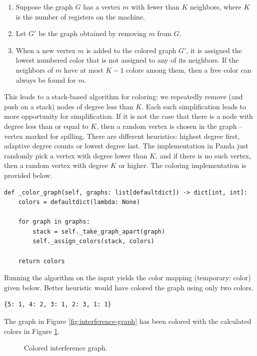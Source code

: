 \begin{enumerate}
    \item Suppose the graph $G$ has a vertex $m$ with fewer than $K$ neighbors, where $K$ is the number of registers on the machine.
    \item Let $G'$ be the graph obtained by removing $m$ from $G$.
    \item When a new vertex $m$ is added to the colored graph $G'$, it is assigned the lowest numbered color that is not assigned to any of its neighbors. If the neighbors of $m$ have at most $K-1$ colors among them, then a free color can always be found for $m$.
\end{enumerate}

This leads to a stack-based algorithm for coloring: we repeatedly remove (and push on a stack) nodes of degree less than $K$. Each such simplification leads to more opportunity for simplification. If it is not the case that there is a node with degree less than or equal to $K$, then a random vertex is chosen in the graph -- vertex marked for spilling. There are different heuristics: highest degree first, adaptive degree counts or lowest degree last. The implementation in Panda just randomly pick a vertex with degree lower than $K$, and if there is no such vertex, then a random vertex with degree $K$ or higher. The coloring implementation is provided below.

\begin{verbatim}
def _color_graph(self, graphs: list[defaultdict]) -> dict[int, int]:
    colors = defaultdict(lambda: None)

    for graph in graphs:
        stack = self._take_graph_apart(graph)
        self._assign_colors(stack, colors)

    return colors
\end{verbatim}

Running the algorithm on the input yields the color mapping (temporary: color) given below. Better heuristic would have colored the graph using only two colors.

\begin{verbatim}
{5: 1, 4: 2, 3: 1, 2: 3, 1: 1}
\end{verbatim}

The graph in Figure \ref{fig:interference-graph} has been colored with the calculated colors in Figure \ref{fig:colored-interference-graph}.

\begin{figure}[H]
    \centering
    
    \caption{Colored interference graph.}
    \label{fig:colored-interference-graph}
\end{figure}


